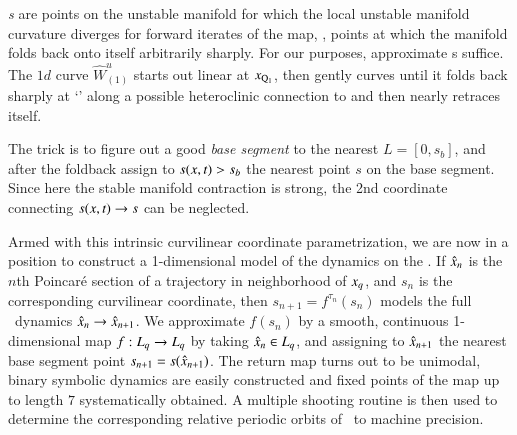 {\em \Turn s} are points on the unstable
manifold for which the local unstable manifold curvature diverges
for forward iterates of the map, \ie, points at which the manifold
folds back onto itself arbitrarily sharply.
For our purposes,
approximate \turn s suffice.
The $1d$ curve $\hat{W}^u_{(1)}$ starts out linear at
$x_{\mathrm{Q}_{1}}$, then gently curves until it folds back sharply
at `\turn' along a possible heteroclinic connection to 
and then nearly retraces itself.

The trick is to figure out a good {\em base segment} to the
nearest {\turn} $L=[0,s_{b}]$, and after the foldback assign
to $s(x,t)>s_{b}$ the nearest point $s$ on the base
segment. Since here the stable manifold contraction is strong, the
2nd coordinate connecting $s(x,t) \to s$ can be neglected.

Armed with this intrinsic curvilinear coordinate
parametrization, we are now in a position to construct a
1-dimensional model of the dynamics on the \nws. If
$\hat{x}_n$ is the $n$th Poincar\'e section of a
trajectory in neighborhood of $x_q$, and $s_n$ is the
corresponding curvilinear coordinate, then $s_{n+1} = f^{\tau_n}(s_n)$
models the full \statesp\ dynamics $\hat{x}_n \to
\hat{x}_{n+1}$. We approximate $f(s_n)$ by a smooth,
continuous 1-dimensional map $f : L_q \to L_q$ by taking
$\hat{x}_n \in L_q$, and assigning to
$\hat{x}_{n+1}$ the nearest base segment point
$s_{n+1}=s(\hat{x}_{n+1})$. The return map turns out to
be unimodal, binary symbolic dynamics are easily constructed
and fixed points of the map up to length
$7$ systematically obtained. A multiple shooting routine is then
used to determine the corresponding relative periodic orbits of
\cLe\ to machine precision.
